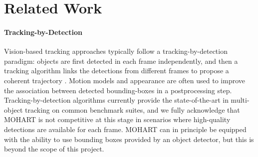     
\section{Related Work}\label{sec:mohart_related}

\paragraph{Tracking-by-Detection} Vision-based tracking approaches typically follow a tracking-by-detection paradigm: objects are first detected in each frame independently, and then a tracking algorithm links the detections from different frames to propose a coherent trajectory \citep{Zhang2008,Milan2014,Bae2017confidence,Keuper2018motion}.
Motion models and appearance are often used to improve the association between detected bounding-boxes in a postprocessing step.
Tracking-by-detection algorithms currently provide the state-of-the-art in multi-object tracking on common benchmark suites, and we fully acknowledge that \gls{MOHART} is not competitive at this stage in scenarios where high-quality detections are available for each frame. \gls{MOHART} can in principle be equipped with the ability to use bounding boxes provided by an object detector, but this is beyond the scope of this project.


